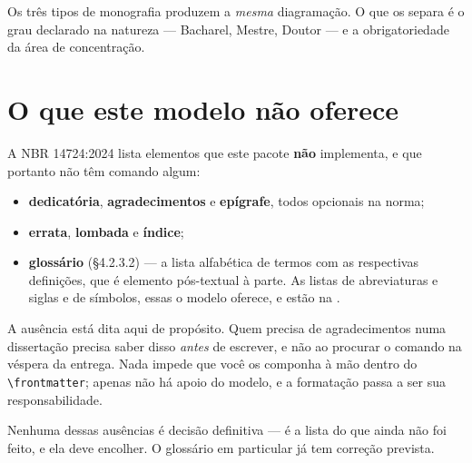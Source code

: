 Os três tipos de monografia produzem a \emph{mesma} diagramação. O que os separa é o grau declarado
na natureza --- Bacharel, Mestre, Doutor --- e a obrigatoriedade da área de concentração.

\section{O que este modelo não oferece}\label{sec:ausencias}

A NBR 14724:2024 lista elementos que este pacote \textbf{não} implementa, e que portanto não têm
comando algum:

\begin{itemize}
    \item \textbf{dedicatória}, \textbf{agradecimentos} e \textbf{epígrafe}, todos opcionais na
          norma;
    \item \textbf{errata}, \textbf{lombada} e \textbf{índice};
    \item \textbf{glossário} (§4.2.3.2) --- a lista alfabética de termos com as respectivas
          definições, que é elemento pós-textual à parte. As listas de abreviaturas e siglas e de
          símbolos, essas o modelo oferece, e estão na .
\end{itemize}

A ausência está dita aqui de propósito. Quem precisa de agradecimentos numa dissertação precisa
saber disso \emph{antes} de escrever, e não ao procurar o comando na véspera da entrega. Nada
impede que você os componha à mão dentro do \verb|\frontmatter|; apenas não há apoio do modelo, e a
formatação passa a ser sua responsabilidade.

Nenhuma dessas ausências é decisão definitiva --- é a lista do que ainda não foi feito, e ela deve
encolher. O glossário em particular já tem correção prevista.

